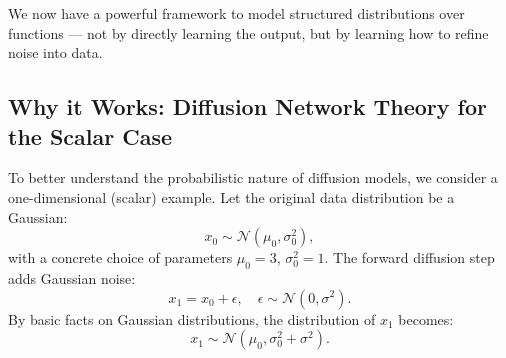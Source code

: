We now have a powerful framework to model structured distributions over functions — not by directly learning the output, but by learning how to refine noise into data.

%
\subsection{Why it Works: Diffusion Network Theory for the Scalar Case}

To better understand the probabilistic nature of diffusion models, we consider a one-dimensional (scalar) example. Let the original data distribution be a Gaussian:
\[
x_0 \sim \mathcal{N}(\mu_0, \sigma_0^2),
\]
with a concrete choice of parameters \( \mu_0 = 3 \), \( \sigma_0^2 = 1 \). The forward diffusion step adds Gaussian noise:
\[
x_1 = x_0 + \epsilon, \quad \epsilon \sim \mathcal{N}(0, \sigma^2).
\]
By basic facts on Gaussian distributions, the distribution of \( x_1 \) becomes:
\[
x_1 \sim \mathcal{N}(\mu_0, \sigma_0^2 + \sigma^2).
\]

